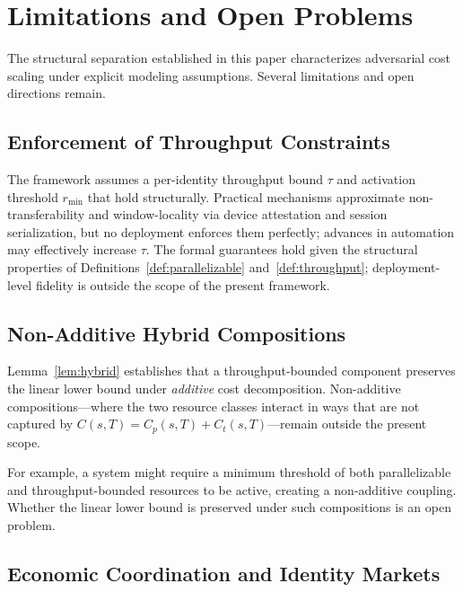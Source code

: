 \documentclass[10pt,journal,compsoc]{IEEEtran}
\theoremstyle{remark}
\begin{document}
	\section{Limitations and Open Problems}
	\label{sec:limitations}
	
	The structural separation established in this paper
	characterizes adversarial cost scaling under explicit
	modeling assumptions.
	Several limitations and open directions remain.
	
	\subsection{Enforcement of Throughput Constraints}
	\label{ssec:lim_enforcement}
	
	The framework assumes a per-identity throughput bound
	$\tau$ and activation threshold $r_{\min}$ that hold
	structurally.
	Practical mechanisms approximate non-transferability
	and window-locality via device attestation and session
	serialization, but no deployment enforces them perfectly;
	advances in automation may effectively increase $\tau$.
	The formal guarantees hold given the structural
	properties of Definitions~\ref{def:parallelizable}
	and~\ref{def:throughput}; deployment-level fidelity
	is outside the scope of the present framework.
	
	\subsection{Non-Additive Hybrid Compositions}
	\label{ssec:lim_hybrid}
	
	Lemma~\ref{lem:hybrid} establishes that a
	throughput-bounded component preserves the linear
	lower bound under \emph{additive} cost decomposition.
	Non-additive compositions---where the two resource
	classes interact in ways that are not captured by
	$C(s,T) = C_p(s,T) + C_t(s,T)$---remain outside
	the present scope.
	
	For example, a system might require a minimum threshold
	of both parallelizable and throughput-bounded resources
	to be active, creating a non-additive coupling.
	Whether the linear lower bound is preserved under
	such compositions is an open problem.
	
	\subsection{Economic Coordination and Identity Markets}
	\label{ssec:lim_markets}
	
\end{document}
